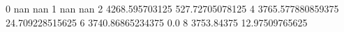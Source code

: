 0 nan nan
1 nan nan
2 4268.595703125 527.72705078125
4 3765.577880859375 24.709228515625
6 3740.86865234375 0.0
8 3753.84375 12.97509765625
